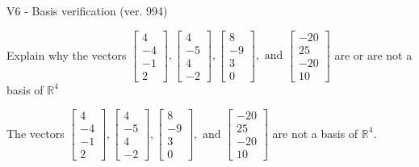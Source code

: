 \begin{exercise}
  \begin{exerciseTitle}V6 - Basis verification (ver. 994)\end{exerciseTitle}
  \begin{exerciseStatement}
    Explain why the vectors \(\left[\begin{array}{r}
4 \\
-4 \\
-1 \\
2
\end{array}\right] , \left[\begin{array}{r}
4 \\
-5 \\
4 \\
-2
\end{array}\right] , \left[\begin{array}{r}
8 \\
-9 \\
3 \\
0
\end{array}\right] , \text{ and } \left[\begin{array}{r}
-20 \\
25 \\
-20 \\
10
\end{array}\right]\) are or are not a basis of \(\mathbb{R}^4\)	


  \end{exerciseStatement}
  \begin{exerciseAnswer}
   The vectors \(\left[\begin{array}{r}
4 \\
-4 \\
-1 \\
2
\end{array}\right] , \left[\begin{array}{r}
4 \\
-5 \\
4 \\
-2
\end{array}\right] , \left[\begin{array}{r}
8 \\
-9 \\
3 \\
0
\end{array}\right] , \text{ and } \left[\begin{array}{r}
-20 \\
25 \\
-20 \\
10
\end{array}\right]\) 
  	 are not  a basis of \(\mathbb{R}^4\).
  


  \end{exerciseAnswer}
\end{exercise}